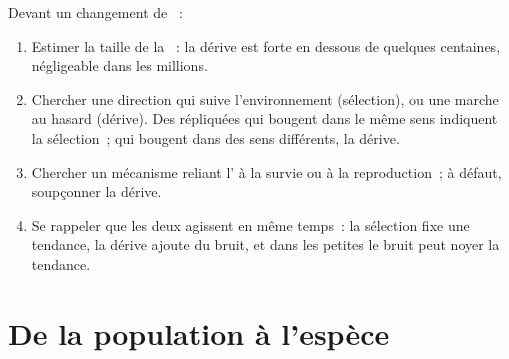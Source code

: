 \begin{method}\label{met:g12:selection-drift-speciation:which}
Devant un changement de ~:
\begin{enumerate}
  \item Estimer la taille de la ~: la dérive est forte en
        dessous de quelques centaines, négligeable dans les millions.
  \item Chercher une direction qui suive l'environnement (sélection),
        ou une marche au hasard (dérive). Des  répliquées
        qui bougent dans le même sens indiquent la sélection~; qui
        bougent dans des sens différents, la dérive.
  \item Chercher un mécanisme reliant l' à la survie ou à la
        reproduction~; à défaut, soupçonner la dérive.
  \item Se rappeler que les deux agissent en même temps~: la sélection
        fixe une tendance, la dérive ajoute du bruit, et dans les
        petites  le bruit peut noyer la tendance.
\end{enumerate}
\end{method}

\section{De la population à l'espèce}

